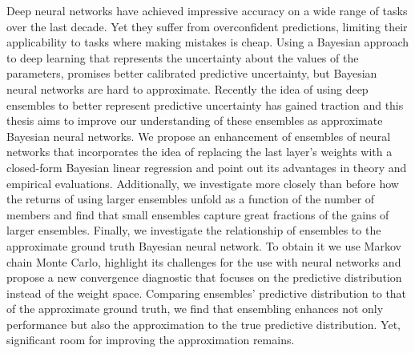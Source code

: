 \documentclass[../thesis.tex]{subfiles}
\begin{document}
Deep neural networks have achieved impressive accuracy on a wide range of tasks over the last decade. Yet they suffer from overconfident predictions, limiting their applicability to tasks where making mistakes is cheap. Using a Bayesian approach to deep learning that represents the uncertainty about the values of the parameters, promises better calibrated predictive uncertainty, but Bayesian neural networks are hard to approximate. Recently the idea of using deep ensembles to better represent predictive uncertainty has gained traction and this thesis aims to improve our understanding of these ensembles as approximate Bayesian neural networks. We propose an enhancement of ensembles of neural networks that incorporates the idea of replacing the last layer's weights with a closed-form Bayesian linear regression and point out its advantages in theory and empirical evaluations. Additionally, we investigate more closely than before how the returns of using larger ensembles unfold as a function of the number of members and find that small ensembles capture great fractions of the gains of larger ensembles.
Finally, we investigate the relationship of ensembles to the approximate ground truth Bayesian neural network. To obtain it we use Markov chain Monte Carlo, highlight its challenges for the use with neural networks and propose a new convergence diagnostic that focuses on the predictive distribution instead of the weight space. Comparing ensembles' predictive distribution to that of the approximate ground truth, we find that ensembling enhances not only performance but also the approximation to the true predictive distribution. Yet, significant room for improving the approximation remains.
 


\end{document}
